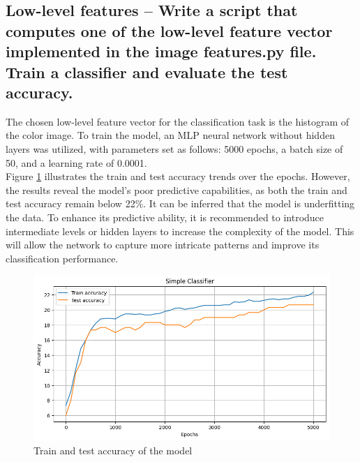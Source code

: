 \documentclass{class}
\begin{document}
\subsection{Low-level features -- Write a script that computes one of the low-level feature vector implemented in the
    image features.py file. Train a classifier and evaluate the test accuracy.}
The chosen low-level feature vector for the classification task is the histogram of the color image.
To train the model, an MLP neural network without hidden layers was utilized, with parameters set as follows: 5000 epochs, a batch size of 50,
and a learning rate of 0.0001.\\
Figure \ref{fig-1} illustrates the train and test accuracy trends over the epochs.
However, the results reveal the model's poor predictive capabilities, as both the train and test accuracy remain below 22\%.
It can be inferred that the model is underfitting the data. To enhance its predictive ability,
it is recommended to introduce intermediate levels or hidden layers to increase the complexity of the model.
This will allow the network to capture more intricate patterns and improve its classification performance.
\begin{figure}[h]
    \centering
    \includegraphics[width=\columnwidth]{images/1.1_simple_model.png}
    \caption{Train and test accuracy of the model}
    \label{fig-1}
\end{figure}
\end{document}
